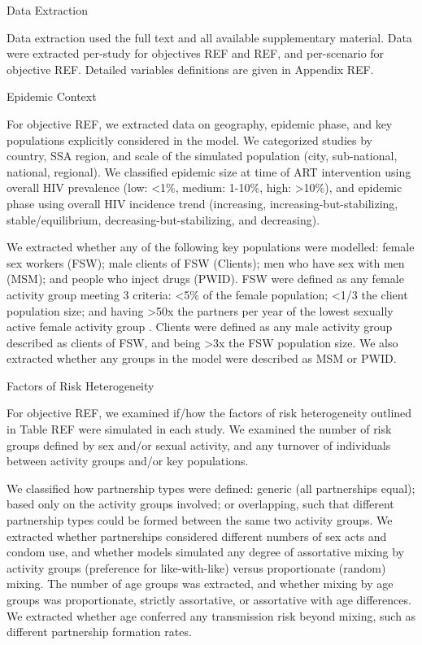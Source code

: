 Data Extraction

Data extraction used the full text and all available supplementary material.
Data were extracted per-study for objectives REF and REF, and
per-scenario for objective REF.
Detailed variables definitions are given in Appendix REF.

Epidemic Context

For objective REF, we extracted data on
geography, epidemic phase, and key populations explicitly considered in the model.
We categorized studies by country, SSA region, and
scale of the simulated population (city, sub-national, national, regional).
We classified epidemic size at time of ART intervention using
overall HIV prevalence (low: <1\%, medium: 1-10\%, high: >10\%),
and epidemic phase using overall HIV incidence trend
(increasing, increasing-but-stabilizing, stable/equilibrium, decreasing-but-stabilizing, and decreasing).

We extracted whether any of the following key populations were modelled:
female sex workers (FSW);
male clients of FSW (Clients);
men who have sex with men (MSM); and
people who inject drugs (PWID).
FSW were defined as any female activity group meeting 3 criteria:
{<5\%} of the female population;
{<1/3} the client population size; and
having {>50x} the partners per year of
the lowest sexually active female activity group \cite{Vandepitte2006,Scorgie2012}.
Clients were defined as any male activity group
described as clients of FSW, and being {>3x} the FSW population size.
We also extracted whether any groups in the model were described as MSM or PWID.

Factors of Risk Heterogeneity

For objective REF, we examined if/how
the factors of risk heterogeneity outlined in Table REF
were simulated in each study.
We examined the number of risk groups defined by sex and/or sexual activity, and
any turnover of individuals between activity groups and/or key populations.

We classified how partnership types were defined:
generic (all partnerships equal);
based only on the activity groups involved;
or overlapping, such that different partnership types could be formed between the same two activity groups.
We extracted whether partnerships considered different
numbers of sex acts and condom use,
and whether models simulated any degree of assortative mixing by activity groups
(preference for like-with-like) versus proportionate (random) mixing.
The number of age groups was extracted, and whether mixing by age groups was
proportionate, strictly assortative, or assortative with age differences.
We extracted whether age conferred any transmission risk beyond mixing,
such as different partnership formation rates.

